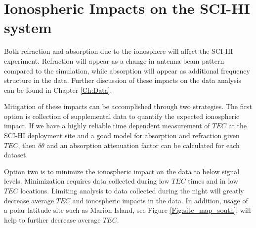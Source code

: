 \section{Ionospheric Impacts on the SCI-HI system}
Both refraction and absorption due to the ionosphere will affect the SCI-HI experiment. Refraction will appear as a change in antenna beam pattern compared to the simulation, while absorption will appear as additional frequency structure in the data. Further discussion of these impacts on the data analysis can be found in Chapter \ref{Ch:Data}. 

Mitigation of these impacts can be accomplished through two strategies. The first option is collection of supplemental data to quantify the expected ionospheric impact. If we have a highly reliable time dependent measurement of $TEC$ at the SCI-HI deployment site and a good model for absorption and refraction given $TEC$, then $\delta \theta$ and an absorption attenuation factor can be calculated for each dataset. 

Option two is to minimize the ionospheric impact on the data to below \cm signal levels. Minimization requires data collected during low $TEC$ times and in low $TEC$ locations. Limiting analysis to data collected during the night will greatly decrease average $TEC$ and ionospheric impacts in the data. In addition, usage of a polar latitude site such as Marion Island, see Figure \ref{Fig:site_map_south}, will help to further decrease average $TEC$.
